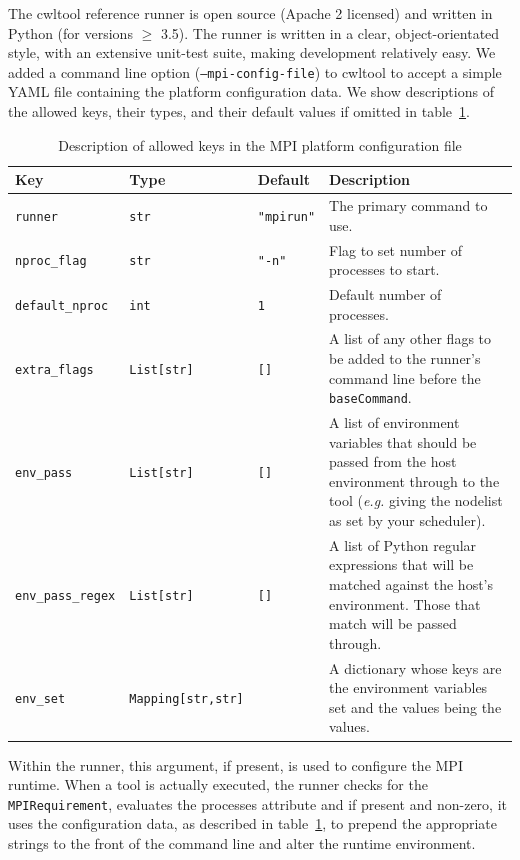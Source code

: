 \documentclass[conference]{IEEEtran}
\newcommand{\cwl}[1]{\texttt{#1}}
\begin{document}
The cwltool reference runner is open source (Apache 2 licensed) and written in Python (for versions $\geq$ 3.5). The runner is written in a clear, object-orientated style, with an extensive unit-test suite, making development relatively easy. We added a command line option (\texttt{--mpi-config-file}) to cwltool to accept a simple YAML file containing the platform configuration data. We show descriptions of the allowed keys, their types, and their default values if omitted in table~\ref{tab:conf-keys}. 

\begin{table}[tb]
\centering
\caption{Description of allowed keys in the MPI platform configuration file}\label{tab:conf-keys}
\begin{tabular}{lllp{}}
\toprule
Key & Type & Default & Description\\
\midrule
\texttt{runner} & \texttt{str} & \texttt{"mpirun"} & The primary command to use. \\
\texttt{nproc_flag} & \texttt{str} & \texttt{"-n"} & Flag to set number of processes to start. \\
\texttt{default_nproc} & \texttt{int} & \texttt{1} & Default number of processes.\\
\texttt{extra_flags} & \texttt{List[str]} & \texttt{[]} & A list of any other flags to be added to the runner's command line before the \cwl{baseCommand}.\\
\texttt{env_pass} & \texttt{List[str]} & \texttt{[]} & A list of environment variables that should be passed from the host environment through to the tool (\emph{e.g.} giving the nodelist as set by your scheduler). \\
\texttt{env_pass_regex} & \texttt{List[str]} & \texttt{[]} & A list of Python regular expressions that will be matched against the host's environment. Those that match will be passed through.\\
\texttt{env_set} & \texttt{Mapping[str,str]} & \texttt{{}} & A dictionary whose keys are the environment variables set and the values being the values.\\
\bottomrule
\end{tabular}
\end{table}

Within the runner, this argument, if present, is used to configure the MPI runtime. When a tool is actually executed, the runner checks for the \cwl{MPIRequirement}, evaluates the processes attribute and if present and non-zero, it uses the configuration data, as described in table~\ref{tab:conf-keys}, to prepend the appropriate strings to the front of the command line and alter the runtime environment. 
\end{document}
